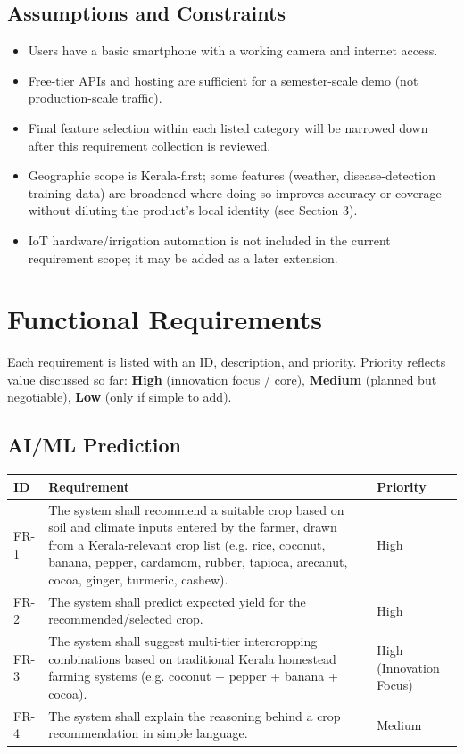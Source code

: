 \documentclass[12pt,a4paper]{article}
\begin{document}
\subsection{Assumptions and Constraints}
\begin{itemize}[leftmargin=*]
    \item Users have a basic smartphone with a working camera and internet access.
    \item Free-tier APIs and hosting are sufficient for a semester-scale demo (not production-scale traffic).
    \item Final feature selection within each listed category will be narrowed down after this requirement collection is reviewed.
    \item Geographic scope is Kerala-first; some features (weather, disease-detection training data) are broadened where doing so improves accuracy or coverage without diluting the product's local identity (see Section 3).
    \item IoT hardware/irrigation automation is not included in the current requirement scope; it may be added as a later extension.
\end{itemize}

\section{Functional Requirements}
Each requirement is listed with an ID, description, and priority. Priority reflects value discussed so far: \textbf{High} (innovation focus / core), \textbf{Medium} (planned but negotiable), \textbf{Low} (only if simple to add).

\subsection{AI/ML Prediction}
\begin{longtable}{p{1.4cm} p{9cm} p{2.3cm}}
\toprule
\textbf{ID} & \textbf{Requirement} & \textbf{Priority} \\
\midrule
\endhead
FR-1 & The system shall recommend a suitable crop based on soil and climate inputs entered by the farmer, drawn from a Kerala-relevant crop list (e.g. rice, coconut, banana, pepper, cardamom, rubber, tapioca, arecanut, cocoa, ginger, turmeric, cashew). & High \\
FR-2 & The system shall predict expected yield for the recommended/selected crop. & High \\
FR-3 & The system shall suggest multi-tier intercropping combinations based on traditional Kerala homestead farming systems (e.g. coconut + pepper + banana + cocoa). & High (Innovation Focus) \\
FR-4 & The system shall explain the reasoning behind a crop recommendation in simple language. & Medium \\
\bottomrule
\end{longtable}
\end{document}
